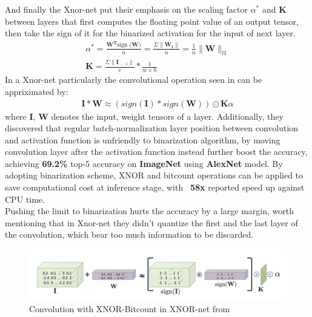 And finally the Xnor-net put their emphasis on the scaling factor $\alpha^*$ and $\boldsymbol{K}$ between layers that first computes the floating point value of an output tensor, then take the sign of it for the binarized activation for the input of next layer.
\begin{equation}
    \begin{aligned}\label{eq:xnornet}
        \alpha^*=\frac{\boldsymbol{W^T}\text{sign ($\boldsymbol{W}$)}}{n}=\frac{\Sigma\|\boldsymbol{W_i}\|}{n}=\frac{1}{n}\|\boldsymbol{W}\|_{l1} \\
        \boldsymbol{K}=\frac{\Sigma\|\boldsymbol{I}_{:,:,i}\|}{c} * \frac{1}{w \times h}
    \end{aligned}
\end{equation}
In a Xnor-net particularly the convolutional operation seen in  can be appriximated by:
\begin{equation}
    \begin{aligned}\label{eq:xnorop}
        \boldsymbol{I}*\boldsymbol{W}\approx(sign(\boldsymbol{I}) * sign(\boldsymbol{W}))\odot\boldsymbol{K}\alpha
    \end{aligned}
\end{equation}
where $\boldsymbol{I}$, $\boldsymbol{W}$ denotes the input, weight tensors of a layer. Additionally, they discovered that regular batch-normalization layer position between convolution and activation function is unfriendly to binarization algorithm, by moving convolution layer after the activation function instead further boost the accuracy, achieving \textbf{69.2\%} top-5 accuracy on \textbf{ImageNet} using \textbf{AlexNet} model. By adopting binarization scheme, XNOR and bitcount operations can be applied to save computational cost at inference stage, with ~\textbf{58x} reported speed up against CPU time. \\
Pushing the limit to binarization hurts the accuracy by a large margin, worth mentioning that in Xnor-net they didn't quantize the first and the last layer of the convolution, which bear too much information to be discarded.
\begin{figure}
    \centering
    \includegraphics[width=0.8\linewidth]{inc/2_related_work/figure/xnor_operation.png}
    \caption{Convolution with XNOR-Bitcount in XNOR-net from \cite{XnorNet}}
    \label{fig:xnor_operation}
\end{figure}
 
